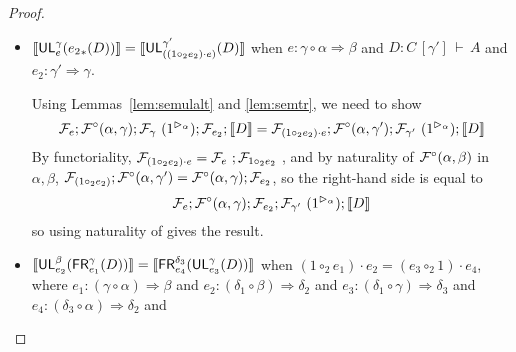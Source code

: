 \documentclass{drl-common/llncs}
\renewcommand{\sem}[1]{\ensuremath{ \llbracket #1 \rrbracket}}
\newcommand{\tc}[2]{\ensuremath{#1 \Rightarrow #2}}
\newcommand\compo[2]{\ensuremath{#1 \circ #2}}
\newcommand\compv[2]{\ensuremath{#1 \cdot #2}}
\newcommand\comph[2]{\ensuremath{#1 \mathbin{\circ_2} #2}}
\newcommand\seq[3]{\ensuremath{#1 \, [ #2 ] \, \vdash \, #3}}
\newcommand\tr[2]{\ensuremath{{{#1}_{*}(#2)}}}
\newcommand\UL[3]{\ensuremath{\dsd{UL}^{#1}_{#2}(#3)}}
\newcommand\FR[3]{\ensuremath{\dsd{FR}^{#1}_{#2}(#3)}}
\begin{document}
\begin{proof}
\begin{itemize}
\item $\sem{\UL{\gamma}{e}{\tr{e_2}{D}}} = \sem{\UL{\gamma'}{(\compv{(\comph{1}{e_2})}{e})}{D}}$
when $e : \tc{\compo{\gamma}{\alpha}}{\beta}$
and $D : \seq{C}{\gamma'}{A}$
and $e_2 : \tc{\gamma'}{\gamma}$.

Using Lemmas~\ref{lem:semulalt} and \ref{lem:semtr}, we need to show
\[
\semFo{e};\semFcomp(\alpha,\gamma);\semF{\gamma}{(\semltor{1}{\alpha})};\semFo{e_2};\sem{D}
=
\semFo{ \compv{(\comph{1}{e_2})}{e}   };\semFcomp(\alpha,\gamma');\semF{\gamma'}{(\semltor{1}{\alpha})};\sem{D}
\]
By functoriality, 
$\semFo{ \compv{(\comph{1}{e_2})}{e}   } = \semF{e};\semF{\comph{1}{e_2}}$, 
and by naturality of $\mathcal{F}^\circ(\alpha,\beta)$ in $\alpha,\beta$,
$\semFo{ {(\comph{1}{e_2})} };\semFcomp(\alpha,\gamma')
= \semFcomp(\alpha,\gamma);\semFo{e_2}$, so
the right-hand side is equal to 
\[
\semFo{e};\semFcomp(\alpha,\gamma);\semFo{e_2};\semF{\gamma'}{(\semltor{1}{\alpha})};\sem{D}
\]
so using naturality of  gives the result.  

\item $\sem{\UL {\beta}{e_2} {\FR {\gamma} {e_1} {D}}} = \sem{\FR {\delta_3} {e_4} {\UL {\gamma} {e_3} {D}}}$
when ${\compv{(\comph{1}{e_1})}{e_2} = {\compv{(\comph{e_3}{1})}{e_4}}}$,
where 
$e_1 : \tc{(\compo {\gamma} {\alpha})}{\beta}$  and
$e_2 : \tc{(\compo {\delta_1} {\beta})}{\delta_2}$ and
$e_3 : \tc{(\compo {\delta_1} {\gamma})}{\delta_3}$ and
$e_4 : \tc{(\compo {\delta_3} {\alpha})}{\delta_2}$ and


\end{itemize}
\end{proof}
\end{document}
